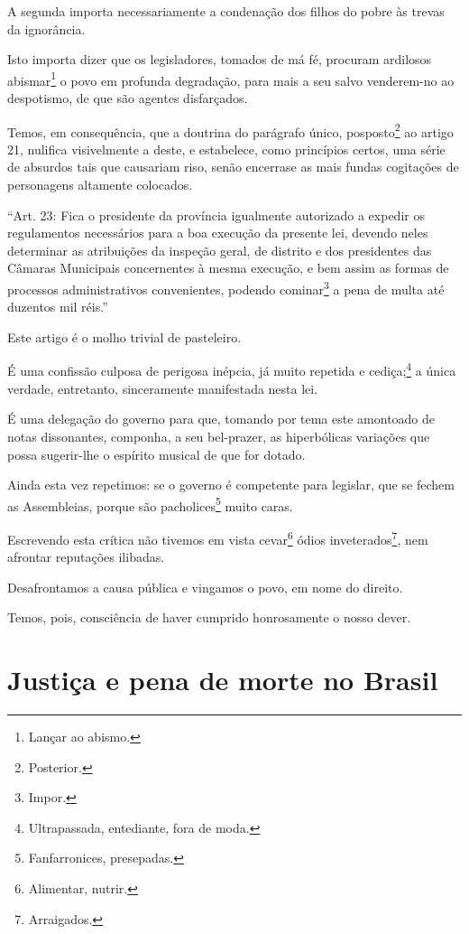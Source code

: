 A segunda importa necessariamente a condenação dos filhos do pobre às
trevas da ignorância.

Isto importa dizer que os legisladores, tomados de má fé, procuram
ardilosos abismar\footnote{Lançar ao abismo.} o povo em profunda
degradação, para mais a seu salvo venderem-no ao despotismo, de que são
agentes disfarçados.

Temos, em consequência, que a doutrina do parágrafo único,
posposto\footnote{Posterior.} ao artigo 21, nulifica visivelmente a
deste, e estabelece, como princípios certos, uma série de absurdos tais
que causariam riso, senão encerrase as mais fundas cogitações de
personagens altamente colocados.

``Art. 23: Fica o presidente da província igualmente autorizado a expedir
os regulamentos necessários para a boa execução da presente lei, devendo
neles determinar as atribuições da inspeção geral, de distrito e dos
presidentes das Câmaras Municipais concernentes à mesma execução, e bem
assim as formas de processos administrativos convenientes, podendo
cominar\footnote{Impor.} a pena de multa até duzentos mil réis.''

Este artigo é o molho trivial de pasteleiro.

É uma confissão culposa de perigosa inépcia, já muito repetida e
cediça;\footnote{Ultrapassada, entediante, fora de moda.} a única
verdade, entretanto, sinceramente manifestada nesta lei.

É uma delegação do governo para que, tomando por tema este amontoado de
notas dissonantes, componha, a seu bel-prazer, as hiperbólicas variações
que possa sugerir-lhe o espírito musical de que for dotado.

Ainda esta vez repetimos: se o governo é competente para legislar, que
se fechem as Assembleias, porque são pacholices\footnote{
  Fanfarronices, presepadas.} muito caras.

Escrevendo esta crítica não tivemos em vista cevar\footnote{Alimentar,
  nutrir.} ódios inveterados\footnote{Arraigados.}, nem afrontar
reputações ilibadas.

Desafrontamos a causa pública e vingamos o povo, em nome do direito.

Temos, pois, consciência de haver cumprido honrosamente o nosso dever.

\part{Justiça e pena de morte no Brasil} %

